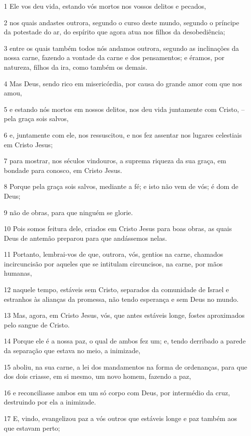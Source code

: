 \par 1 Ele vos deu vida, estando vós mortos nos vossos delitos e pecados,
\par 2 nos quais andastes outrora, segundo o curso deste mundo, segundo o príncipe da potestade do ar, do espírito que agora atua nos filhos da desobediência;
\par 3 entre os quais também todos nós andamos outrora, segundo as inclinações da nossa carne, fazendo a vontade da carne e dos pensamentos; e éramos, por natureza, filhos da ira, como também os demais.
\par 4 Mas Deus, sendo rico em misericórdia, por causa do grande amor com que nos amou,
\par 5 e estando nós mortos em nossos delitos, nos deu vida juntamente com Cristo, -- pela graça sois salvos,
\par 6 e, juntamente com ele, nos ressuscitou, e nos fez assentar nos lugares celestiais em Cristo Jesus;
\par 7 para mostrar, nos séculos vindouros, a suprema riqueza da sua graça, em bondade para conosco, em Cristo Jesus.
\par 8 Porque pela graça sois salvos, mediante a fé; e isto não vem de vós; é dom de Deus;
\par 9 não de obras, para que ninguém se glorie.
\par 10 Pois somos feitura dele, criados em Cristo Jesus para boas obras, as quais Deus de antemão preparou para que andássemos nelas.
\par 11 Portanto, lembrai-vos de que, outrora, vós, gentios na carne, chamados incircuncisão por aqueles que se intitulam circuncisos, na carne, por mãos humanas,
\par 12 naquele tempo, estáveis sem Cristo, separados da comunidade de Israel e estranhos às alianças da promessa, não tendo esperança e sem Deus no mundo.
\par 13 Mas, agora, em Cristo Jesus, vós, que antes estáveis longe, fostes aproximados pelo sangue de Cristo.
\par 14 Porque ele é a nossa paz, o qual de ambos fez um; e, tendo derribado a parede da separação que estava no meio, a inimizade,
\par 15 aboliu, na sua carne, a lei dos mandamentos na forma de ordenanças, para que dos dois criasse, em si mesmo, um novo homem, fazendo a paz,
\par 16 e reconciliasse ambos em um só corpo com Deus, por intermédio da cruz, destruindo por ela a inimizade.
\par 17 E, vindo, evangelizou paz a vós outros que estáveis longe e paz também aos que estavam perto;

